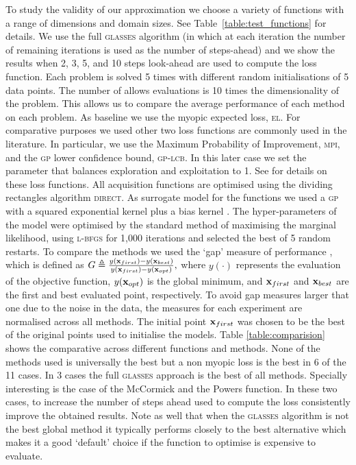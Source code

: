 \documentclass[twoside]{article}
\newcommand{\acr}[1]{\textsc{#1}\xspace}
\newcommand{\gp}{\acr{gp}}
\newcommand{\us}{\acr{glasses}}
\newcommand{\direct}{\acr{direct}}
\newcommand{\lbfgs}{\acr{l-bfgs}}
\newcommand{\mpi}{\acr{mpi}}
\newcommand{\el}{\acr{el}}
\newcommand{\lcb}{\acr{gp-lcb}}
\begin{document}
To study the validity of our approximation we choose a variety of functions with a range of dimensions and domain sizes. See Table~\ref{table:test_functions} for details. We use the full \us algorithm (in which at each iteration the number of remaining iterations is used as the number of steps-ahead) and we show the results when 2, 3, 5, and 10 steps look-ahead are used to compute the loss function. Each problem is solved 5 times with different random initialisations of 5 data points. The number of allows evaluations is 10 times the dimensionality of the problem. This allows us to compare the average performance of each method on each problem. As baseline we use the myopic expected loss, \el. For comparative purposes we used other two loss functions are commonly used in the literature. In particular, we use the Maximum Probability of Improvement, \mpi, and the \gp lower confidence bound, \lcb. In this later case we set the parameter that balances exploration and exploitation to 1. See \citep{Snoek*Larochelle*Adams_2012} for details on these loss functions. All acquisition functions are optimised using the dividing rectangles algorithm \direct \citep{Jones1993}.
 As surrogate model for the functions we used a \gp with a squared exponential kernel plus a bias kernel \citep{Rasmussen:2005:GPM:1162254}. The hyper-parameters of the model were optimised by the standard method of maximising the marginal likelihood, using \lbfgs \citep{Nocedal1980} for 1,000 iterations and selected the best of 5 random restarts.
To compare the methods we used the `gap' measure of performance \citep{Huang:2006}, which is defined as $G \triangleq \frac{y(\mathbf{x}_{first})-y(\mathbf{x}_{best})}{y(\mathbf{x}_{first})-y(\mathbf{x}_{opt})},$
where $y(\cdot)$ represents the evaluation of the objective function, $y(\mathbf{x}_{opt})$ is the global minimum, and $\mathbf{x}_{first}$ and $\mathbf{x}_{best}$ are the first and best evaluated point, respectively. To avoid gap measures larger that one due to the noise in the data, the measures for each experiment are normalised across all methods. The initial point $\mathbf{x}_{first}$ was chosen to be the best of the original points used to initialise the models.  Table \ref{table:comparision} shows the comparative across different functions and methods. None of the methods used is universally the best but a non myopic loss is the best in 6 of the 11 cases. In 3 cases the full \us approach is the best of all methods. Specially interesting is the case of the McCormick and the Powers function. In these two cases, to increase the number of steps ahead used to compute the loss consistently improve the obtained results. Note as well that when the \us algorithm is not the best global method it typically performs closely to the best alternative which makes it a good `default' choice if the function to optimise is expensive to evaluate.
\end{document}
